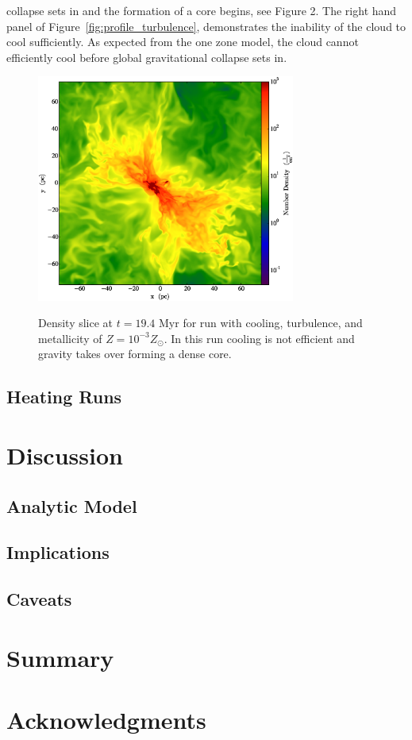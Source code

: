 \documentclass[useAMS,usenatbib]{mn2e}
\begin{document}
collapse sets in and the formation of a core begins, see Figure 2. The right
hand panel of Figure~\ref{fig:profile_turbulence}, demonstrates the inability of the cloud to cool
sufficiently. As expected from the one zone model, the cloud cannot efficiently
cool before global gravitational collapse sets in.
\begin{figure}
\begin{center}
\mbox{\includegraphics[width=8.5cm]{Images/density_slice}}
\end{center}
\caption{\label{fig:slice_turbulence}} Density slice at $t=19.4$ Myr for run with
cooling, turbulence, and metallicity of $Z=10^{-3}Z_\odot$. In this run cooling is
not efficient and gravity takes over forming a dense core. 
\end{figure}

 
\subsection{Heating Runs}

% 
\section{Discussion}
\label{sec:discussion}
\subsection{Analytic Model}
\subsection{Implications}
\subsection{Caveats}

% 
\section{Summary}

% 
\section*{Acknowledgments}

%
\end{document}
